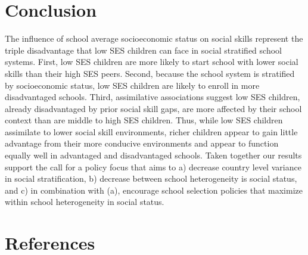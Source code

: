 \documentclass[
  english,
  man]{apa6}
\begin{document}
\hypertarget{conclusion}{%
\section{Conclusion}\label{conclusion}}

The influence of school average socioeconomic status on social skills represent the triple disadvantage that low SES children can face in social stratified school systems. First, low SES children are more likely to start school with lower social skills than their high SES peers. Second, because the school system is stratified by socioeconomic status, low SES children are likely to enroll in more disadvantaged schools. Third, assimilative associations suggest low SES children, already disadvantaged by prior social skill gaps, are more affected by their school context than are middle to high SES children. Thus, while low SES children assimilate to lower social skill environments, richer children appear to gain little advantage from their more conducive environments and appear to function equally well in advantaged and disadvantaged schools. Taken together our results support the call for a policy focus that aims to a) decrease country level variance in social stratification, b) decrease between school heterogeneity is social status, and c) in combination with (a), encourage school selection policies that maximize within school heterogeneity in social status.

\newpage

\hypertarget{references}{%
\section{References}\label{references}}

\begingroup
\setlength{\parindent}{-0.5in}
\setlength{\leftskip}{0.5in}
\end{document}
